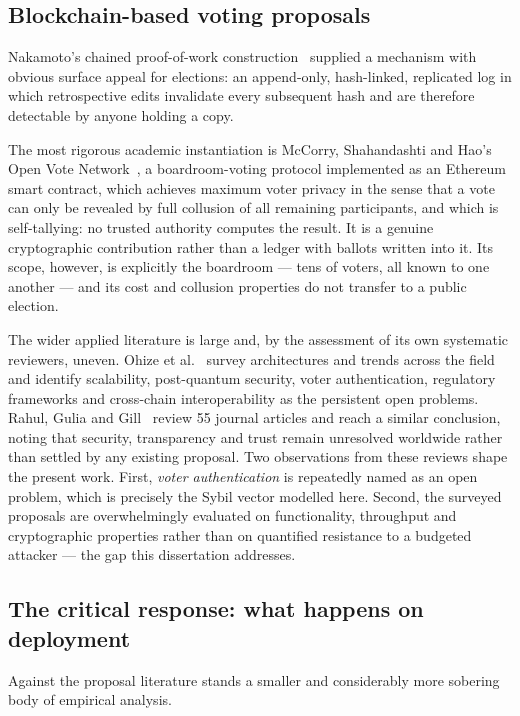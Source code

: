 \subsection{Blockchain-based voting proposals}
\label{sec:lit-bcvoting}

Nakamoto's chained proof-of-work construction~\cite{nakamoto2008}
supplied a mechanism with obvious surface appeal for elections: an
append-only, hash-linked, replicated log in which retrospective edits
invalidate every subsequent hash and are therefore detectable by anyone
holding a copy.

The most rigorous academic instantiation is McCorry, Shahandashti and
Hao's Open Vote Network~\cite{mccorry2017}, a boardroom-voting protocol
implemented as an Ethereum smart contract, which achieves maximum voter
privacy in the sense that a vote can only be revealed by full collusion
of all remaining participants, and which is self-tallying: no trusted
authority computes the result. It is a genuine cryptographic
contribution rather than a ledger with ballots written into it. Its
scope, however, is explicitly the boardroom --- tens of voters, all
known to one another --- and its cost and collusion properties do not
transfer to a public election.

The wider applied literature is large and, by the assessment of its own
systematic reviewers, uneven. Ohize et al.~\cite{ohize2025} survey
architectures and trends across the field and identify scalability,
post-quantum security, voter authentication, regulatory frameworks and
cross-chain interoperability as the persistent open problems. Rahul,
Gulia and Gill~\cite{rahul2025} review 55 journal articles and reach a
similar conclusion, noting that security, transparency and trust remain
unresolved worldwide rather than settled by any existing proposal. Two
observations from these reviews shape the present work. First,
\emph{voter authentication} is repeatedly named as an open problem,
which is precisely the Sybil vector modelled here. Second, the surveyed
proposals are overwhelmingly evaluated on functionality, throughput and
cryptographic properties rather than on quantified resistance to a
budgeted attacker --- the gap this dissertation addresses.

\subsection{The critical response: what happens on deployment}
\label{sec:lit-critique}

Against the proposal literature stands a smaller and considerably more
sobering body of empirical analysis.

